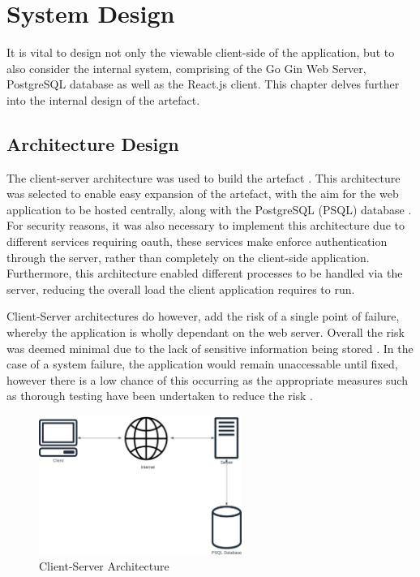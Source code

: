 \section{System Design}
\label{design:system}

It is vital to design not only the viewable client-side of the application, but to also consider the internal system, comprising of the Go Gin Web Server, PostgreSQL database as well as the React.js client. This chapter delves further into the internal design of the artefact. 

\subsection{Architecture Design}
\label{system:architecture-design}

The client-server architecture was used to build the artefact . This architecture was selected to enable easy expansion of the artefact, with the aim for the web application to be hosted centrally, along with the PostgreSQL (PSQL) database . For security reasons, it was also necessary to implement this architecture due to different services requiring oauth, these services make enforce authentication through the server, rather than completely on the client-side application. Furthermore, this architecture enabled different processes to be handled via the server, reducing the overall load the client application requires to run.

Client-Server architectures do however, add the risk of a single point of failure, whereby the application is wholly dependant on the web server. Overall the risk was deemed minimal due to the lack of sensitive information being stored . In the case of a system failure, the application would remain unaccessable until fixed, however there is a low chance of this occurring as the appropriate measures such as thorough testing have been undertaken to reduce the risk .

\clearpage
\begin{figure}[!ht]
  \centering
  \includegraphics[width=250px]{figures/client-server.png}
  \caption{Client-Server Architecture}
  \label{fig:clientserver}
\end{figure}

